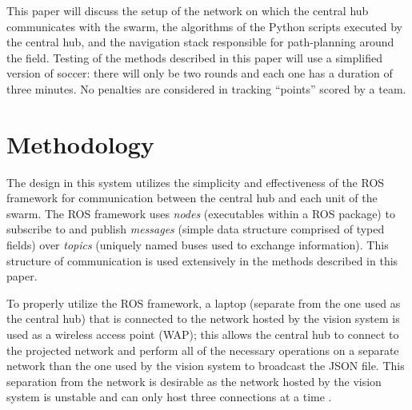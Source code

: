 \documentclass{article}
\begin{document}
     \par This paper will discuss the setup of the network on which the central hub communicates with the swarm, the algorithms of the Python scripts executed by the central hub, and the navigation stack responsible for path-planning around the field. Testing of the methods described in this paper will use a simplified version of soccer: there will only be two rounds and each one has a duration of three minutes. No penalties are considered in tracking ``points'' scored by a team.

     \section{Methodology}
     The design in this system utilizes the simplicity and effectiveness of the ROS framework for communication between the central hub and each unit of the swarm. The ROS framework uses \textit{nodes} (executables within a ROS package) to subscribe to and publish \textit{messages} (simple data structure comprised of typed fields) over \textit{topics} (uniquely named buses used to exchange information). This structure of communication is used extensively in the methods described in this paper.

     \par To properly utilize the ROS framework, a laptop (separate from the one used as the central hub) that is connected to the network hosted by the vision system is used as a wireless access point (WAP); this allows the central hub to connect to the projected network and perform all of the necessary operations on a separate network than the one used by the vision system to broadcast the JSON file. This separation from the network is desirable as the network hosted by the vision system is unstable and can only host three connections at a time \cite{ProjectDescription}.
\end{document}
